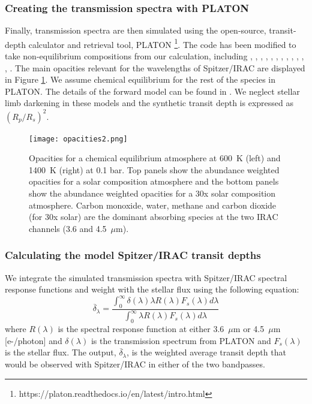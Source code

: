 \subsubsection{Creating the transmission spectra with PLATON}
\label{P1:subsec:PLATON}

Finally, transmission spectra are then simulated using the open-source, transit-depth calculator and retrieval tool, PLATON \citep{Zhang2019}\footnote{https://platon.readthedocs.io/en/latest/intro.html}. The code has been modified to take non-equilibrium compositions from our calculation, including , , , , , , , , , , , , . The main opacities relevant for the wavelengths of Spitzer/IRAC are displayed in Figure \ref{P1:fig:opacities}. We assume chemical equilibrium for the rest of the species in PLATON. The details of the forward model can be found in \citet{Zhang2019}. We neglect stellar limb darkening in these models and the synthetic transit depth is expressed as $(R_p/R_s)^2$.

\begin{figure}
    \centering
    \texttt{[image: opacities2.png]}
    \caption{Opacities for a chemical equilibrium atmosphere at 600~K (left) and 1400~K (right) at 0.1 bar. Top panels show the abundance weighted opacities for a solar composition atmosphere and the bottom panels show the abundance weighted opacities for a 30x solar composition atmosphere. Carbon monoxide, water, methane and carbon dioxide (for 30x solar) are the dominant absorbing species at the two IRAC channels (3.6 and 4.5~$\mu$m).}
    \label{P1:fig:opacities}
\end{figure}


\subsubsection{Calculating the model Spitzer/IRAC transit depths}

We integrate the simulated transmission spectra with Spitzer/IRAC spectral response functions and weight with the stellar flux using the following equation:
\begin{equation}
\overline{\delta}_{\lambda} = \frac{\int_0^\infty  \delta(\lambda) \lambda R(\lambda) F_{s}(\lambda) d\lambda}{\int_0^\infty  \lambda R(\lambda) F_{s}(\lambda) d\lambda}
\end{equation}
where $R(\lambda)$ is the spectral response function at either 3.6~$\mu$m or 4.5~$\mu$m [e-/photon] \citep{Quijada2004} and $\delta(\lambda)$ is the transmission spectrum from PLATON and $F_{s}(\lambda)$ is the stellar flux. The output, $\overline{\delta}_{\lambda}$, is the weighted average transit depth that would be observed with Spitzer/IRAC in either of the two bandpasses.

